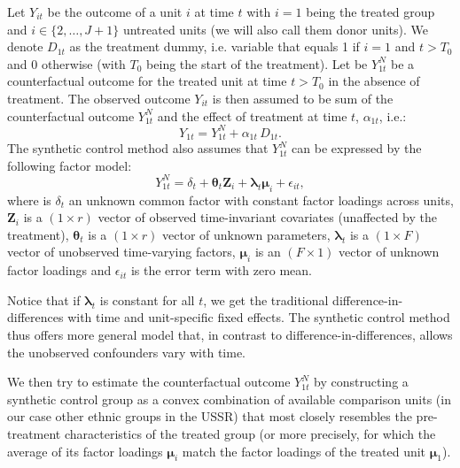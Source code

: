 Let $Y_{it}$ be the outcome of a unit $i$ at time $t$ with $i = 1$ being the treated group and $i \in \{ 2, \dots, J + 1 \}$ untreated units (we will also call them donor units).  We
denote $D_{1t}$ as the treatment dummy, i.e. variable that equals 1 if $i = 1$ and $t > T_0$ and 0 otherwise (with $T_0$ being the start of the treatment). 
Let be $Y_{1t}^N$ be a counterfactual outcome for the treated unit at time $t > T_0$ in the absence of treatment. 
The observed outcome $Y_{it}$ is then assumed to be  sum of the counterfactual outcome $Y_{1t}^N$ and the effect of treatment at time $t$, $\alpha_{1t}$, i.e.:
\begin{equation}
    Y_{1t} = Y_{1t}^N + \alpha_{1t} \, D_{1t}.
\end{equation}
The synthetic control method also assumes that $Y_{1t}^N$  can be expressed by the following factor model:
\begin{equation} \label{factor_model}
   Y_{1t}^N = \delta_t + \boldsymbol{\theta}_t \boldsymbol{Z}_i +
   \boldsymbol{\lambda}_t \boldsymbol{\mu}_i + \epsilon_{it},
\end{equation}
where is $\delta_t$ an unknown common factor with constant factor
loadings across units, $\boldsymbol{Z}_i$ is a
$(1 \times r)$ vector of observed time-invariant covariates (unaffected by the treatment),  $\boldsymbol{\theta}_t$ is a $(1 \times r)$ vector of
unknown parameters, $\boldsymbol{\lambda}_t$ is a $(1 \times F)$ vector of unobserved time-varying factors, $\boldsymbol{\mu}_i$ is an $(F \times 1)$ vector of unknown factor loadings
and $\epsilon_{it}$ is the error term with zero mean.

Notice that if $\boldsymbol{\lambda}_t$ is constant  for all $t$, we get the traditional
difference-in-differences with time and unit-specific fixed effects. 
The synthetic control method thus offers more general model that, in contrast to difference-in-differences, allows the unobserved confounders vary with time.


We then try to estimate the counterfactual outcome $Y_{1t}^N$  by constructing a synthetic control group  as a convex combination of available comparison units (in our case other ethnic groups in the USSR) that most closely resembles the pre-treatment characteristics of the treated group
 (or more precisely, for which the average of its factor loadings $\boldsymbol{\mu}_i$ match the factor loadings of the treated unit  $\boldsymbol{\mu}_1$). 
 
